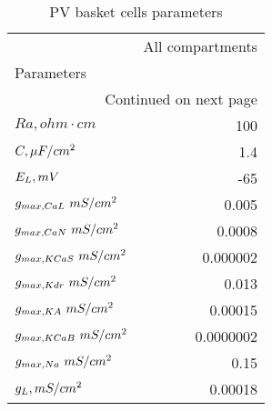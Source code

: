 \begin{longtable}{lr}
\caption{PV basket cells parameters}\label{ca1_pvbas_cell_parameters}\\
\toprule
{} &      All compartments \\
Parameters       &           \\
\midrule
\endhead
\midrule
\multicolumn{2}{r}{{Continued on next page}} \\
\midrule
\endfoot

\bottomrule
\endlastfoot
$Ra,
 ohm \cdot cm$               &       100 \\
$C, \linebreak \mu F / cm^2$               &       1.4 \\
$E_L, \linebreak mV$        &       -65 \\
$g_{max, CaL     }\linebreak \  mS / cm^2$&     0.005 \\
$g_{max, CaN     }\linebreak \  mS / cm^2$&    0.0008 \\
$g_{max, KCaS     }\linebreak \  mS / cm^2$&  0.000002 \\
$g_{max, Kdr  }\linebreak \  mS / cm^2$&     0.013 \\
$g_{max, KA      }\linebreak \  mS / cm^2$&   0.00015 \\
$g_{max, KCaB    }\linebreak \  mS / cm^2$& 0.0000002 \\
$g_{max, Na }\linebreak \  mS / cm^2$&      0.15 \\
$g_L, \linebreak mS / cm^2$     &   0.00018 \\
\end{longtable}
